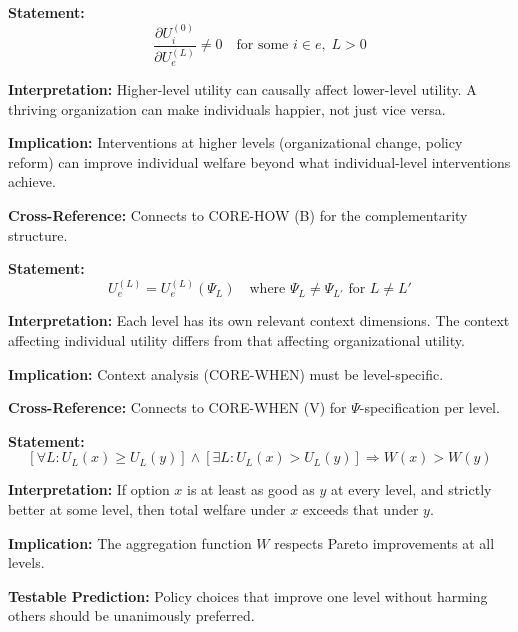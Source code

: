 \begin{tcolorbox}[colback=gray!5!white, colframe=gray!75!black,
    title=Axiom UNMAPPED_SRL-4: Downward Causation]
\textbf{Statement:}
\begin{equation}
\frac{\partial U_i^{(0)}}{\partial U_e^{(L)}} \neq 0 \quad \text{for some } i \in e, \; L > 0
\end{equation}

\textbf{Interpretation:} Higher-level utility can causally affect lower-level utility.
A thriving organization can make individuals happier, not just vice versa.

\textbf{Implication:} Interventions at higher levels (organizational change, policy reform)
can improve individual welfare beyond what individual-level interventions achieve.

\textbf{Cross-Reference:} Connects to CORE-HOW (B) for the complementarity structure.
\end{tcolorbox}

\begin{tcolorbox}[colback=gray!5!white, colframe=gray!75!black,
    title=Axiom UNMAPPED_SRL-5: Level-Specific Context]
\textbf{Statement:}
\begin{equation}
U_e^{(L)} = U_e^{(L)}(\Psi_L) \quad \text{where } \Psi_L \neq \Psi_{L'} \text{ for } L \neq L'
\end{equation}

\textbf{Interpretation:} Each level has its own relevant context dimensions.
The context affecting individual utility differs from that affecting organizational utility.

\textbf{Implication:} Context analysis (CORE-WHEN) must be level-specific.

\textbf{Cross-Reference:} Connects to CORE-WHEN (V) for $\Psi$-specification per level.
\end{tcolorbox}

\begin{tcolorbox}[colback=gray!5!white, colframe=gray!75!black,
    title=Axiom UNMAPPED_SRL-6: Pareto Consistency]
\textbf{Statement:}
\begin{equation}
\left[ \forall L: U_L(x) \geq U_L(y) \right] \land \left[ \exists L: U_L(x) > U_L(y) \right] \Rightarrow W(x) > W(y)
\end{equation}

\textbf{Interpretation:} If option $x$ is at least as good as $y$ at every level, and strictly
better at some level, then total welfare under $x$ exceeds that under $y$.

\textbf{Implication:} The aggregation function $W$ respects Pareto improvements at all levels.

\textbf{Testable Prediction:} Policy choices that improve one level without harming others
should be unanimously preferred.
\end{tcolorbox}

